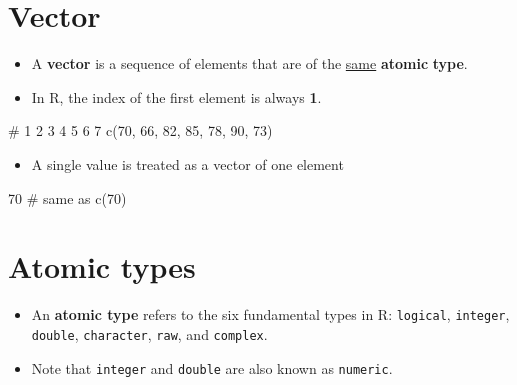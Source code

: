 \documentclass[
  letterpaper,
  DIV=11,
  numbers=noendperiod]{scrreprt}
\newenvironment{Shaded}{\begin{snugshade}}{\end{snugshade}}
\newcommand{\CommentTok}[1]{\textcolor[rgb]{0.37,0.37,0.37}{#1}}
\newcommand{\DecValTok}[1]{\textcolor[rgb]{0.68,0.00,0.00}{#1}}
\newcommand{\FunctionTok}[1]{\textcolor[rgb]{0.28,0.35,0.67}{#1}}
\newcommand{\NormalTok}[1]{\textcolor[rgb]{0.00,0.23,0.31}{#1}}
\providecommand{\tightlist}{%
  \setlength{\itemsep}{0pt}\setlength{\parskip}{0pt}}\usepackage{longtable,booktabs,array}
\begin{document}
\section{Vector}\label{vector}

\begin{itemize}
\item
  A \textbf{vector} is a sequence of elements that are of the \ul{same}
  \textbf{atomic} \textbf{type}.
\item
  In R, the index of the first element is always \textbf{1}.
\end{itemize}

\begin{Shaded}
\begin{Highlighting}[]
\CommentTok{\#  1   2   3   4   5   6   7}
\FunctionTok{c}\NormalTok{(}\DecValTok{70}\NormalTok{, }\DecValTok{66}\NormalTok{, }\DecValTok{82}\NormalTok{, }\DecValTok{85}\NormalTok{, }\DecValTok{78}\NormalTok{, }\DecValTok{90}\NormalTok{, }\DecValTok{73}\NormalTok{)}
\end{Highlighting}
\end{Shaded}

\begin{itemize}
\tightlist
\item
  A single value is treated as a vector of one element
\end{itemize}

\begin{Shaded}
\begin{Highlighting}[]
\DecValTok{70}    \CommentTok{\# same as c(70)}
\end{Highlighting}
\end{Shaded}

\section{Atomic types}\label{atomic-types}

\begin{itemize}
\item
  An \textbf{atomic type} refers to the six fundamental types in R:
  \texttt{logical}, \texttt{integer}, \texttt{double},
  \texttt{character}, \texttt{raw}, and \texttt{complex}.
\item
  Note that \texttt{integer} and \texttt{double} are also known as
  \texttt{numeric}.
\end{itemize}
\end{document}
